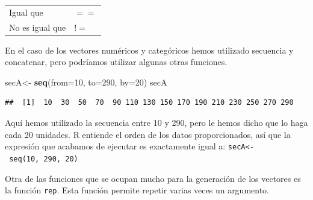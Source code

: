 \documentclass[]{article}
\newenvironment{Shaded}{\begin{snugshade}}{\end{snugshade}}
\newcommand{\KeywordTok}[1]{\textcolor[rgb]{0.13,0.29,0.53}{\textbf{{#1}}}}
\newcommand{\DataTypeTok}[1]{\textcolor[rgb]{0.13,0.29,0.53}{{#1}}}
\newcommand{\DecValTok}[1]{\textcolor[rgb]{0.00,0.00,0.81}{{#1}}}
\newcommand{\StringTok}[1]{\textcolor[rgb]{0.31,0.60,0.02}{{#1}}}
\newcommand{\NormalTok}[1]{{#1}}
\begin{document}
\begin{longtable}[]{@{}ll@{}}
\begin{minipage}[t]{0.29\columnwidth}\raggedright\strut
Igual que\strut
\end{minipage} & \begin{minipage}[t]{0.17\columnwidth}\raggedright\strut
\(==\)\strut
\end{minipage}\tabularnewline
\begin{minipage}[t]{0.29\columnwidth}\raggedright\strut
No es igual que\strut
\end{minipage} & \begin{minipage}[t]{0.17\columnwidth}\raggedright\strut
\(!=\)\strut
\end{minipage}\tabularnewline
\bottomrule
\end{longtable}

En el caso de los vectores numéricos y categóricos hemos utilizado
secuencia y concatenar, pero podríamos utilizar algunas otras funciones.

\begin{Shaded}
\begin{Highlighting}[]
\NormalTok{secA<-}\StringTok{ }\KeywordTok{seq}\NormalTok{(}\DataTypeTok{from=}\DecValTok{10}\NormalTok{, }\DataTypeTok{to=}\DecValTok{290}\NormalTok{, }\DataTypeTok{by=}\DecValTok{20}\NormalTok{)}
\NormalTok{secA}
\end{Highlighting}
\end{Shaded}

\begin{verbatim}
##  [1]  10  30  50  70  90 110 130 150 170 190 210 230 250 270 290
\end{verbatim}

Aquí hemos utilizado la secuencia entre 10 y 290, pero le hemos dicho
que lo haga cada 20 unidades. R entiende el orden de los datos
proporcionados, así que la expresión que acabamos de ejecutar es
exactamente igual a: \texttt{secA\textless{}-\ seq(10,\ 290,\ 20)}

Otra de las funciones que se ocupan mucho para la generación de los
vectores es la función \texttt{rep}. Esta función permite repetir varias
veces un argumento.
\end{document}
